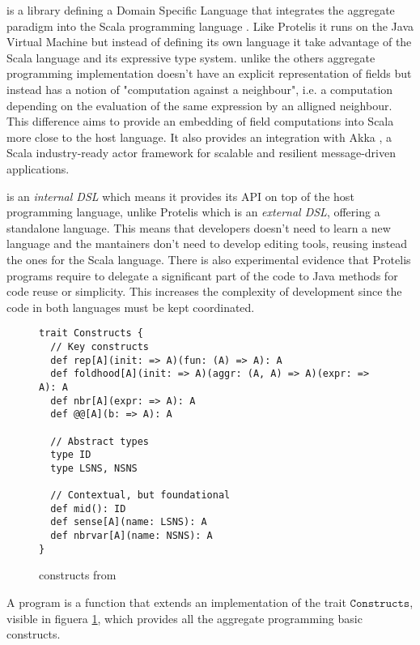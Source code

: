 \Scafi{} \cite{ScafiFirst, Scafi} is a library defining a Domain Specific Language that integrates the aggregate paradigm into the Scala programming language \cite{Scala}. Like Protelis it runs on the Java Virtual Machine but instead of defining its own language it take advantage of the Scala language and its expressive type system. \Scafi{} unlike the others aggregate programming implementation doesn't have an explicit representation of fields but instead has a notion of "computation against a neighbour", i.e. a computation depending on the evaluation of the same expression by an alligned neighbour. This difference aims to provide an embedding of field computations into Scala more close to the host language. It also provides an integration with Akka \cite{Akka}, a Scala industry-ready actor framework for scalable and resilient message-driven applications.

\Scafi{} is an \textit{internal DSL} which means it provides its API on top of the host programming language, unlike Protelis which is an \textit{external DSL}, offering a standalone language. This means that developers doesn't need to learn a new language and the \Scafi{} mantainers don't need to develop editing tools, reusing instead the ones for the Scala language. There is also experimental evidence that Protelis programs require to delegate a significant part of the code to Java methods for code reuse or simplicity. This increases the complexity of development since the code in both languages must be kept coordinated.

\begin{figure}[t]
\begin{lstlisting}[language={scafi},frame=single]
trait Constructs {
  // Key constructs
  def rep[A](init: => A)(fun: (A) => A): A
  def foldhood[A](init: => A)(aggr: (A, A) => A)(expr: => A): A
  def nbr[A](expr: => A): A
  def @@[A](b: => A): A

  // Abstract types
  type ID
  type LSNS, NSNS

  // Contextual, but foundational
  def mid(): ID
  def sense[A](name: LSNS): A
  def nbrvar[A](name: NSNS): A
}
\end{lstlisting}
\caption{\Scafi{} constructs from \cite{Scafi}}\label{fig:scaficonstructs}
\end{figure}

A \Scafi{} program is a function that extends an implementation of the trait $\mathtt{Constructs}$, visible in figuera \ref{fig:scaficonstructs}, which provides all the aggregate programming basic constructs. 

